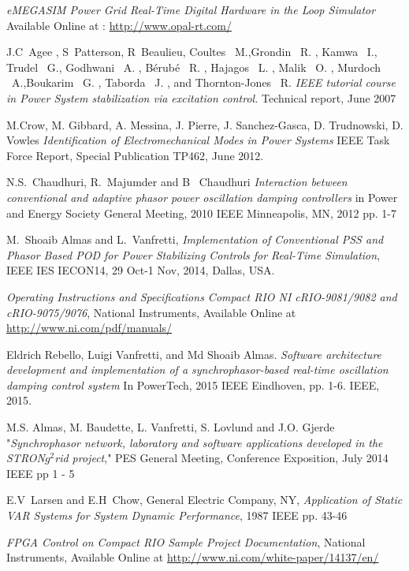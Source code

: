 \documentclass{ieeeaccess}
\begin{document}
\begin{thebibliography}{00}
 \emph{eMEGASIM Power Grid Real-Time Digital Hardware in the Loop Simulator} Available Online at : \underline{http://www.opal-rt.com/}

 J.C~Agee , S~Patterson, R~Beaulieu, Coultes \ M.,Grondin \ R. , Kamwa \ I.,
Trudel \ G., Godhwani \ A. , Bérubé \ R. , Hajagos \ L. , Malik \ O. , Murdoch \ A.,Boukarim \ G. , Taborda \ J. , and Thornton-Jones \ R. \emph{IEEE tutorial course in Power System stabilization via excitation control.} Technical report, June 2007


 M.Crow, M. Gibbard, A. Messina, J. Pierre, J. Sanchez-Gasca, D. Trudnowski, D. Vowles \emph{Identification of Electromechanical Modes in Power Systems} IEEE Task Force Report, Special Publication TP462, June 2012.

 N.S.~Chaudhuri, R.~Majumder and B~ Chaudhuri \emph{Interaction between conventional and adaptive phasor power oscillation damping controllers} in Power and Energy Society General Meeting, 2010 IEEE Minneapolis, MN, 2012 pp. 1-7
  
 M.~Shoaib Almas and L.~Vanfretti, \emph{Implementation of Conventional PSS and Phasor Based POD for Power Stabilizing Controls for Real-Time Simulation}, IEEE IES IECON14, 29 Oct-1 Nov, 2014, Dallas, USA.

 \emph{Operating Instructions and Specifications Compact RIO NI cRIO-9081/9082 and cRIO-9075/9076}, National Instruments, Available Online at \underline{http://www.ni.com/pdf/manuals/}

Eldrich Rebello, Luigi Vanfretti, and Md Shoaib Almas. \emph{Software architecture development and implementation of a synchrophasor-based real-time oscillation damping control system} In PowerTech, 2015 IEEE Eindhoven, pp. 1-6. IEEE, 2015.

 M.S. Almas, M. Baudette, L. Vanfretti, S. Lovlund and J.O. Gjerde "\emph{Synchrophasor network, laboratory and software applications developed in the STRON$g^{2}$rid project}," PES General Meeting, Conference Exposition, July 2014 IEEE pp 1 - 5

 E.V~Larsen and E.H~Chow, General Electric Company, NY, \emph{Application of Static VAR Systems for System Dynamic Performance}, 1987 IEEE pp. 43-46

 \emph{FPGA Control on Compact RIO Sample Project Documentation}, National Instruments, Available Online at \underline{http://www.ni.com/white-paper/14137/en/}



\end{thebibliography}
\end{document}
